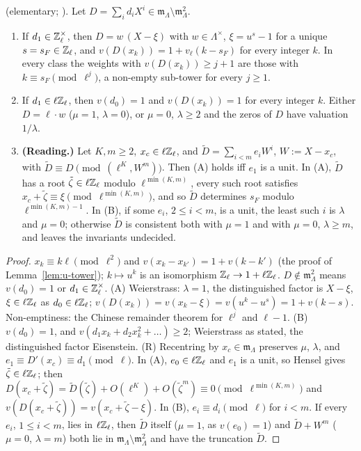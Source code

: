\documentclass[11pt]{article}
\newcommand{\Iw}{\Lambda}                         %
\newcommand{\Zl}{\Z_\ell}
\begin{document}
\begin{lemma}\label{lem:u-DFread}
\PROVED{} (elementary; \STD{Weierstrass preparation in $\Iw$}). Let $D=\sum_i d_iX^{i}\in\mathfrak m_\Iw\setminus\mathfrak m_\Iw^{2}$.
\begin{enumerate}
\item[(A)] If $d_1\in\Zl^{\times}$, then $D=w\,(X-\xi)$ with $w\in\Iw^{\times}$, $\xi=u^{s}-1$ for a unique $s=s_F\in\Zl$, and $v(D(x_k))=1+v_\ell(k-s_F)$ for every integer $k$. In
  every class the weights with $v(D(x_k))\ge j+1$ are those with $k\equiv s_F\pmod{\ell^{j}}$, a non-empty sub-tower for every $j\ge1$.
\item[(B)] If $d_1\in\ell\Zl$, then $v(d_0)=1$ and $v(D(x_k))=1$ for every integer $k$. Either $D=\ell\cdot w$ ($\mu=1$, $\lambda=0$), or $\mu=0$, $\lambda\ge2$ and the zeros of $D$
  have valuation $1/\lambda$.
\item[(R)] \textbf{(Reading.)} Let $K,m\ge2$, $x_c\in\ell\Zl$, and $\tilde D=\sum_{i<m}e_iW^{i}$, $W:=X-x_c$, with $\tilde D\equiv D\pmod{(\ell^{K},W^{m})}$. Then (A) holds iff $e_1$ is a unit.
  In (A), $\tilde D$ has a root $\tilde\zeta\in\ell\Zl$ modulo $\ell^{\min(K,m)}$, every such root satisfies $x_c+\tilde\zeta\equiv\xi\pmod{\ell^{\min(K,m)}}$, and so $\tilde D$ determines $s_F$
  modulo $\ell^{\min(K,m)-1}$. In (B), if some $e_i$, $2\le i<m$, is a unit, the least such $i$ is $\lambda$ and $\mu=0$; otherwise $\tilde D$ is consistent both with $\mu=1$ and
  with $\mu=0$, $\lambda\ge m$, and leaves the invariants undecided.
\end{enumerate}
\end{lemma}

\begin{proof}
$x_k\equiv k\ell\pmod{\ell^{2}}$ and $v(x_k-x_{k'})=1+v(k-k')$ (the proof of Lemma~\ref{lem:u-tower}); $k\mapsto u^{k}$ is an isomorphism $\Zl\to1+\ell\Zl$.
$D\notin\mathfrak m_\Iw^{2}$ means $v(d_0)=1$ or $d_1\in\Zl^{\times}$. (A) Weierstrass: $\lambda=1$, the distinguished factor is $X-\xi$, $\xi\in\ell\Zl$ as $d_0\in\ell\Zl$; $v(D(x_k))=v(x_k-\xi)=v(u^{k}-u^{s})=1+v(k-s)$.
Non-emptiness: the Chinese remainder theorem for $\ell^{j}$ and $\ell-1$. (B) $v(d_0)=1$, and $v(d_1x_k+d_2x_k^{2}+\dots)\ge2$; Weierstrass as stated, the distinguished factor Eisenstein. (R) Recentring by $x_c\in\mathfrak m_\Iw$
preserves $\mu$, $\lambda$, and $e_1\equiv D'(x_c)\equiv d_1\pmod\ell$. In (A), $e_0\in\ell\Zl$ and $e_1$ is a unit, so Hensel gives $\tilde\zeta\in\ell\Zl$; then
$D(x_c+\tilde\zeta)=\tilde D(\tilde\zeta)+O(\ell^{K})+O(\tilde\zeta^{m})\equiv0\pmod{\ell^{\min(K,m)}}$ and $v(D(x_c+\tilde\zeta))=v(x_c+\tilde\zeta-\xi)$. In (B), $e_i\equiv
d_i\pmod\ell$ for $i<m$. If every $e_i$, $1\le i<m$, lies in $\ell\Zl$, then $\tilde D$ itself ($\mu=1$, as $v(e_0)=1$) and $\tilde D+W^{m}$
($\mu=0$, $\lambda=m$) both lie in $\mathfrak m_\Iw\setminus\mathfrak m_\Iw^{2}$ and have the truncation $\tilde D$.
\end{proof}
\end{document}
